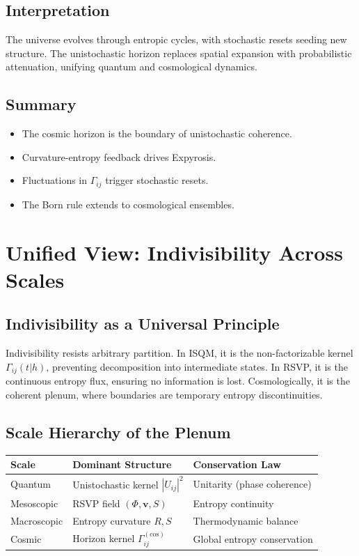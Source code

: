 \documentclass[12pt]{article}
\begin{document}
{\subsection{Interpretation}

The universe evolves through entropic cycles, with stochastic resets seeding new structure. The unistochastic horizon replaces spatial expansion with probabilistic attenuation, unifying quantum and cosmological dynamics.

\subsection{Summary}

\begin{itemize}[noitemsep]
\item The cosmic horizon is the boundary of unistochastic coherence.
\item Curvature-entropy feedback drives Expyrosis.
\item Fluctuations in \(\Gamma_{ij}\) trigger stochastic resets.
\item The Born rule extends to cosmological ensembles.
\end{itemize}

\section{Unified View: Indivisibility Across Scales}

\subsection{Indivisibility as a Universal Principle}

Indivisibility resists arbitrary partition. In ISQM, it is the non-factorizable kernel \(\Gamma_{ij}(t | h)\), preventing decomposition into intermediate states. In RSVP, it is the continuous entropy flux, ensuring no information is lost. Cosmologically, it is the coherent plenum, where boundaries are temporary entropy discontinuities.

\subsection{Scale Hierarchy of the Plenum}

\begin{center}
\begin{tabular}{@{}lll@{}}
\toprule
\textbf{Scale} & \textbf{Dominant Structure} & \textbf{Conservation Law} \\
\midrule
Quantum & Unistochastic kernel \(|U_{ij}|^2\) & Unitarity (phase coherence) \\
Mesoscopic & RSVP field \((\Phi, \mathbf{v}, S)\) & Entropy continuity \\
Macroscopic & Entropy curvature \(R, S\) & Thermodynamic balance \\
Cosmic & Horizon kernel \(\Gamma_{ij}^{(\mathrm{cos})}\) & Global entropy conservation \\
\bottomrule
\end{tabular}
\end{center}

}
\end{document}
